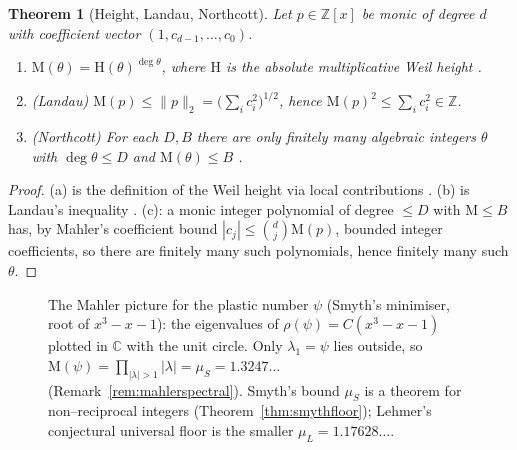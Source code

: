 \documentclass[11pt]{article}
\theoremstyle{plain}
\newtheorem{theorem}{Theorem}[section]
\theoremstyle{definition}
\theoremstyle{remark}
\newcommand{\Z}{\mathbb{Z}}
\newcommand{\C}{\mathbb{C}}
\newcommand{\Mah}{\mathrm{M}}
\newcommand{\height}{\mathrm{H}}
\begin{document}
\begin{theorem}[Height, Landau, Northcott]\label{thm:height}
Let $p\in\Z[x]$ be monic of degree $d$ with coefficient vector $(1,c_{d-1},\dots,c_0)$.
\begin{enumerate}[label=(\alph*),leftmargin=*]
  \item $\Mah(\theta)=\height(\theta)^{\deg\theta}$, where $\height$ is the absolute multiplicative Weil
        height \cite{BombieriGubler}.
  \item \emph{(Landau)} $\Mah(p)\le \lVert p\rVert_2=\big(\sum_i c_i^2\big)^{1/2}$, hence
        $\Mah(p)^2\le \sum_i c_i^2\in\Z$.
  \item \emph{(Northcott)} For each $D,B$ there are only finitely many algebraic integers $\theta$ with
        $\deg\theta\le D$ and $\Mah(\theta)\le B$ \cite{Northcott}.
\end{enumerate}
\end{theorem}
\begin{proof}
(a) is the definition of the Weil height via local contributions \cite{BombieriGubler}. (b) is Landau's
inequality \cite{Landau,Mahler}. (c): a monic integer polynomial of degree $\le D$ with $\Mah\le B$ has, by
Mahler's coefficient bound $|c_j|\le\binom{d}{j}\Mah(p)$, bounded integer coefficients, so there are finitely
many such polynomials, hence finitely many such $\theta$.
\end{proof}

\begin{figure}[ht]
\centering
{}
\caption{The Mahler picture for the plastic number $\psi$ (Smyth's minimiser, root of $x^3-x-1$): the
eigenvalues of $\rho(\psi)=C(x^3-x-1)$ plotted in $\C$ with the unit circle. Only $\lambda_1=\psi$ lies
outside, so $\Mah(\psi)=\prod_{|\lambda|>1}|\lambda|=\mu_S=1.3247\ldots$ (Remark~\ref{rem:mahlerspectral}).
Smyth's bound $\mu_S$ is a theorem for non--reciprocal integers (Theorem~\ref{thm:smythfloor}); Lehmer's
conjectural universal floor is the smaller $\mu_L=1.17628\ldots$.}
\label{fig:mahler}
\end{figure}
\end{document}
